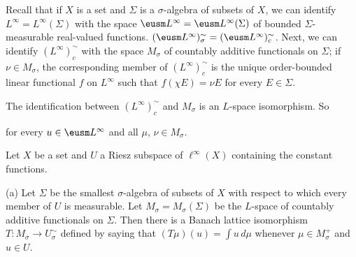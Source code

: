 Recall that if $X$ is a set and $\Sigma$ is a $\sigma$-algebra of
subsets of
$X$, we can identify $L^{\infty}=L^{\infty}(\Sigma)$ with the space
$\eusm L^{\infty}=\eusm L^{\infty}(\Sigma)$ of bounded
$\Sigma$-measurable real-valued functions.
$(\eusm L^{\infty})^{\sim}_{\sigma}=(\eusm L^{\infty})^{\sim}_c$.
Next, we can
identify $(L^{\infty})^{\sim}_c$ with the space $M_{\sigma}$ of
countably additive functionals on
$\Sigma$;  if $\nu\in M_{\sigma}$, the corresponding
member of $(L^{\infty})^{\sim}_c$ is the unique
order-bounded linear functional $f$ on
$L^{\infty}$ such that
$f(\chi E)=\nu E$ for every $E\in\Sigma$.   

The identification between $(L^{\infty})^{\sim}_c$ and
$M_{\sigma}$ is an $L$-space isomorphism.
So


\noindent for every $u\in\eusm L^{\infty}$ and all $\mu$,
$\nu\in M_{\sigma}$.

 Let $X$ be a set and $U$ a Riesz subspace of
$\ell^{\infty}(X)$ containing the constant functions.

(a) Let $\Sigma$ be the smallest $\sigma$-algebra of subsets of $X$ with
respect to which every member of $U$ is measurable.   Let
$M_{\sigma}=M_{\sigma}(\Sigma)$ be the $L$-space of countably additive
functionals on $\Sigma$.
Then there is a Banach lattice
isomorphism $T:M_{\sigma}\to U^{\sim}_{\sigma}$ defined by saying that
$(T\mu)(u)=\int u\,d\mu$ whenever $\mu\in M_{\sigma}^+$ and $u\in U$.

